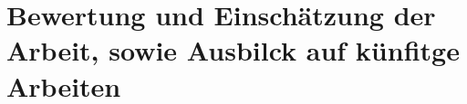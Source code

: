 \documentclass[
	12pt,
	BCOR=5mm,
	DIV=12,
	headinclude=on,
	footinclude=off,
	parskip=half,
	bibliography=totoc,
	listof=entryprefix,
	toc=listof,
	numbers=noenddot,
	plainfootsepline
]{scrreprt}
\begin{document}
\chapter{Bewertung und Einschätzung der Arbeit, sowie Ausbilck auf künfitge Arbeiten}
\clearpage
\ihead{}
\printbibliography[title=Literaturverzeichnis]
\cleardoublepage



\end{document}
